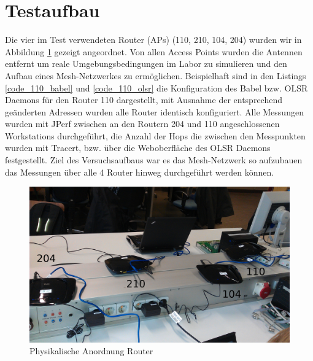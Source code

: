\documentclass[10pt]{scrartcl}
\author{André Harms, Oliver Steenbuck}
\title{\titletext}
\date{09.11.2011}
\begin{document}
\maketitle

\setcounter{tocdepth}{3}
\tableofcontents

	\listoftables                                 												%
	\listoffigures   

\section{Testaufbau}
	Die vier im Test verwendeten Router (APs) (110, 210, 104, 204) wurden wir in Abbildung \ref{img:testAufbau} gezeigt angeordnet. 	Von allen Access Points wurden die Antennen entfernt um reale Umgebungsbedingungen im Labor zu simulieren und den Aufbau eines Mesh-Netzwerkes zu ermöglichen. Beispielhaft sind in den Listings \ref{code_110_babel} und \ref{code_110_olsr} die Konfiguration des Babel bzw. OLSR Daemons für den Router 110 dargestellt, mit Ausnahme der entsprechend geänderten Adressen wurden alle Router identisch konfiguriert.  
		Alle Messungen wurden mit JPerf zwischen an den Routern 204 und 110 angeschlossenen Workstations durchgeführt, die Anzahl der Hops die zwischen den Messpunkten wurden mit Tracert, bzw. über die Weboberfläche des OLSR Daemons festgestellt. Ziel des Versuchsaufbaus war es das Mesh-Netzwerk so aufzubauen das Messungen über alle 4 Router hinweg durchgeführt werden können.
		
	\begin{figure}[H]
        \centering
                \includegraphics[width=\textwidth]{img/AufbauBild}
        \caption{Physikalische Anordnung Router}
        \label{img:testAufbau}
	\end{figure}	
	
\end{document}
